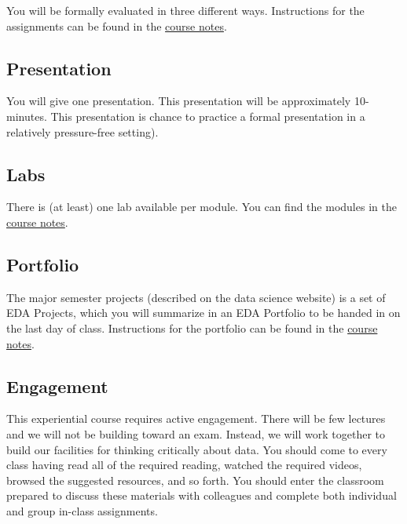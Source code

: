 You will be formally evaluated in three different ways. Instructions for the assignments can be found in the \href{https://datascience4psych.github.io/DataScience4Psych/}{course notes}.

\hypertarget{presentation}{%
\subsection*{Presentation}\label{presentation}}


You will give one presentation. This presentation will be approximately 10-minutes. This presentation is chance to practice a formal presentation in a relatively pressure-free setting).

\hypertarget{labs}{%
\subsection*{Labs}\label{labs}}


There is (at least) one lab available per module. You can find the modules in the \href{https://datascience4psych.github.io/DataScience4Psych/}{course notes}.

\hypertarget{portfolio}{%
\subsection*{Portfolio}\label{portfolio}}


The major semester projects (described on the data science website) is a set of EDA Projects, which you will summarize in an EDA Portfolio to be handed in on the last day of class. Instructions for the portfolio can be found in the \href{https://datascience4psych.github.io/DataScience4Psych/}{course notes}.

\hypertarget{engagement}{%
\subsection*{Engagement}\label{engagement}}


This experiential course requires active engagement. There will be few lectures and we will not be building toward an exam. Instead, we will work together to build our facilities for thinking critically about data. You should come to every class having read all of the required reading, watched the required videos, browsed the suggested resources, and so forth. You should enter the classroom prepared to discuss these materials with colleagues and complete both individual and group in-class assignments.

